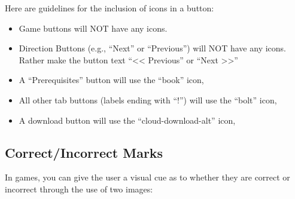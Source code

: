 \documentclass[
]{book}
\providecommand{\tightlist}{%
  \setlength{\itemsep}{0pt}\setlength{\parskip}{0pt}}
\begin{document}
Here are guidelines for the inclusion of icons in a button:

\begin{itemize}
\tightlist
\item
  Game buttons will NOT have any icons.
\item
  Direction Buttons (e.g., ``Next'' or ``Previous'') will NOT have any icons. Rather make the button text ``\textless\textless{} Previous'' or ``Next \textgreater\textgreater{}''
\item
  A ``Prerequisites'' button will use the ``book'' icon, 
\item
  All other tab buttons (labels ending with ``!'') will use the ``bolt'' icon, 
\item
  A download button will use the ``cloud-download-alt'' icon, 
\end{itemize}

\hypertarget{correctincorrect-marks}{%
\subsection{Correct/Incorrect Marks}\label{correctincorrect-marks}}

In games, you can give the user a visual cue as to whether they are correct or incorrect through the use of two images:
\end{document}
